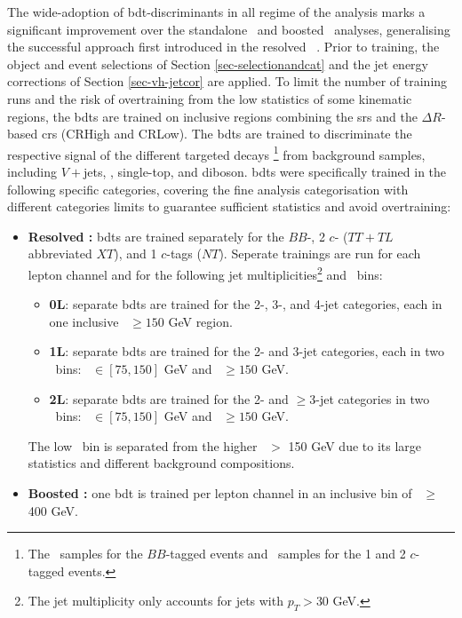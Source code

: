 The wide-adoption of \gls{bdt}-discriminants in all regime of the analysis marks a significant improvement over the standalone \vhc\ and boosted \vhb\ analyses, generalising the successful approach first introduced in the resolved \vhb\ \cite{ATLAS:2020fcp}. Prior to training, the object and event selections of Section \ref{sec-selectionandcat} and the jet energy corrections of Section \ref{sec-vh-jetcor} are applied. To limit the number of training runs and the risk of overtraining from the low statistics of some kinematic regions, the \gls{bdt}s are trained on inclusive regions combining the \gls{sr}s and the $\Delta R$-based \gls{cr}s (CRHigh and CRLow). The \gls{bdt}s are trained to discriminate the respective signal of the different targeted decays \footnote{The \vhb\ samples for the $BB$-tagged events and \vhc\ samples for the 1 and 2 $c$-tagged events.} from background samples, including $V+$jets, \ttb, single-top, and diboson. \gls{bdt}s were specifically trained in the following specific categories, covering the fine analysis categorisation with different categories limits to guarantee sufficient statistics and avoid overtraining:
\begin{itemize}[leftmargin=*]
  \item \textbf{Resolved \boldvhbc:} \gls{bdt}s are trained separately for the $BB$-, 2 $c$- ($TT+TL$ abbreviated $XT$), and 1 $c$-tags ($NT$). Seperate trainings are run for each lepton channel and for the following jet multiplicities\footnote{The jet multiplicity only accounts for jets with $p_T > 30$ GeV.} and \ptv\ bins:
  \begin{itemize}
      \item \textbf{0L}: separate \gls{bdt}s are trained for the 2-, 3-, and 4-jet categories, each in one inclusive \ptv\ $\geq 150$ GeV region.
      \item \textbf{1L}: separate \gls{bdt}s are trained for the 2- and 3-jet categories, each in two \ptv\ bins: \ptv\ $\in [75, 150]$ GeV and \ptv\ $\geq 150$ GeV.
      \item \textbf{2L}: separate \gls{bdt}s are trained for the 2- and $\geq$3-jet categories in two \ptv\ bins: \ptv\ $\in [75, 150]$ GeV and \ptv\ $\geq 150$ GeV.
  \end{itemize}
  The low \ptv\ bin is separated from the higher \ptv\ $>$ 150 GeV due to its large statistics and different background compositions.
  \item \textbf{Boosted \vhb:} one \gls{bdt} is trained per lepton channel in an inclusive bin of \ptv\ $\geq$ 400 GeV.
\end{itemize}

